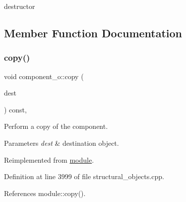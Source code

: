 destructor 



\subsection{Member Function Documentation}
\mbox{\label{classcomponent__o_abdd94a898eec3592371908dbe9ade6b4}} 
\subsubsection{\texorpdfstring{copy()}{copy()}}
{\footnotesize\ttfamily void component\+\_\+o\+::copy (\begin{DoxyParamCaption}\item[{\hyperlink{structural__objects_8hpp_a8ea5f8cc50ab8f4c31e2751074ff60b2}{structural\+\_\+object\+Ref}}]{dest }\end{DoxyParamCaption}) const\hspace{0.3cm}{\ttfamily [override]}, {\ttfamily [virtual]}}



Perform a copy of the component. 


\begin{DoxyParams}{Parameters}
{\em dest} & destination object. \\
\hline
\end{DoxyParams}


Reimplemented from \hyperlink{classmodule_ac19167af53d30fe69ccc16881cd61425}{module}.



Definition at line 3999 of file structural\+\_\+objects.\+cpp.



References module\+::copy().


